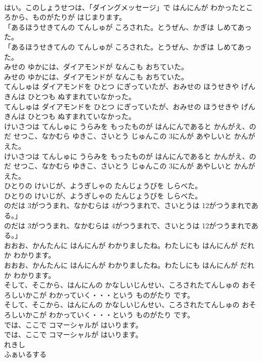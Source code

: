 \documentclass[8pt]{extreport}
\begin{document}
\begin{CJK}{UTF8}{min}
\\	はい。このしょうせつは、「ダイングメッセージ」で はんにんが わかったところから、ものがたりが はじまります。
\\	「あるほうせきてんの てんしゅが ころされた。とうぜん、かぎは しめてあった。
\\	「あるほうせきてんの てんしゅが ころされた。とうぜん、かぎは しめてあった。
\\	みせの ゆかには、ダイアモンドが なんこも おちていた。
\\	みせの ゆかには、ダイアモンドが なんこも おちていた。
\\	てんしゅは ダイアモンドを ひとつ にぎっていたが、おみせの ほうせきや げんきんは ひとつも ぬすまれていなかった。
\\	てんしゅは ダイアモンドを ひとつ にぎっていたが、おみせの ほうせきや げんきんは ひとつも ぬすまれていなかった。
\\	けいさつは てんしゅに うらみを もったものが はんにんであると かんがえ、のだ せつこ、なかむら ゆきこ、さいとう じゅんこの 3にんが あやしいと かんがえた。
\\	けいさつは てんしゅに うらみを もったものが はんにんであると かんがえ、のだ せつこ、なかむら ゆきこ、さいとう じゅんこの 3にんが あやしいと かんがえた。
\\	ひとりの けいじが、ようぎしゃの たんじょうびを しらべた。
\\	ひとりの けいじが、ようぎしゃの たんじょうびを しらべた。
\\	のだは 3がつうまれ、なかむらは 4がつうまれで、さいとうは 12がつうまれである。」
\\	のだは 3がつうまれ、なかむらは 4がつうまれで、さいとうは 12がつうまれである。」
\\	おおお、かんたんに はんにんが わかりましたね。わたしにも はんにんが だれか わかります。
\\	おおお、かんたんに はんにんが わかりましたね。わたしにも はんにんが だれか わかります。
\\	そして、そこから、はんにんの かなしいじんせい、ころされたてんしゅの おそろしいかこが わかっていく・・・という ものがたり です。
\\	そして、そこから、はんにんの かなしいじんせい、ころされたてんしゅの おそろしいかこが わかっていく・・・という ものがたり です。
\\	では、ここで コマーシャルが はいります。
\\	では、ここで コマーシャルが はいります。
\\	れきし
\\	ふぁいるする

\end{CJK}
\end{document}
